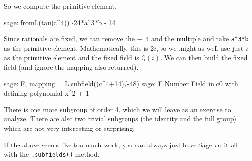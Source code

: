 %
So we compute the primitive element.
%
\begin{sageexample}
sage: fromL(tau(c^4))
-24*a^3*b - 14
\end{sageexample}
%
Since rationals are fixed, we can remove the $-14$ and the multiple and take \verb?a^3*b? as the primitive element.  Mathematically, this is $2i$, so we might as well use just $i$ as the primitive element and the fixed field is ${\mathbb Q}(i)$.  We can then build the fixed field (and ignore the mapping also returned).
%
\begin{sageexample}
sage: F, mapping = L.subfield((c^4+14)/-48)
sage: F
Number Field in c0 with defining polynomial x^2 + 1
\end{sageexample}
%
There is one more subgroup of order 4, which we will leave as an exercise to analyze.  There are also two trivial subgroups (the identity and the full group) which are not very interesting or surprising.\par
%
If the above seems like too much work, you can always just have Sage do it all with the \verb?.subfields()? method.
%
